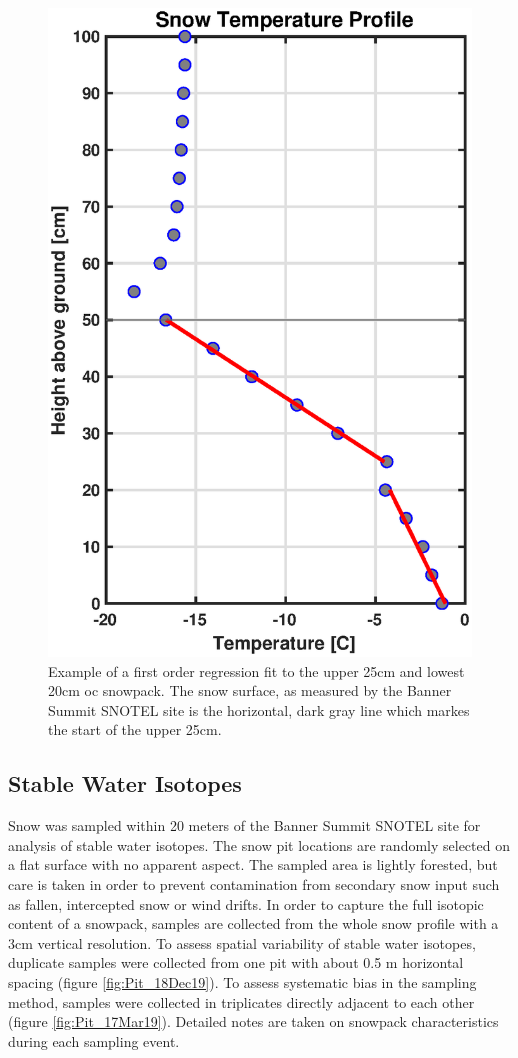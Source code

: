 \begin{figure}[H]
    \centering
    \includegraphics[width=0.5\linewidth]{figures/TempGrad/TempGrad_Ex.eps}
    \caption{Example of a first order regression fit to the upper 25cm and lowest 20cm oc snowpack. The snow surface, as measured by the Banner Summit SNOTEL site is the horizontal, dark gray line which markes the start of the upper 25cm.}
    \label{fig:TempGrad_Ex}
\end{figure}

\subsection{Stable Water Isotopes}
Snow was sampled within 20 meters of the Banner Summit SNOTEL site for analysis of stable water isotopes. The snow pit locations are randomly selected on a flat surface with no apparent aspect. The sampled area is lightly forested, but care is taken in order to prevent contamination from secondary snow input such as fallen, intercepted snow or wind drifts. In order to capture the full isotopic content of a snowpack, samples are collected from the whole snow profile with a 3cm vertical resolution. To assess spatial variability of stable water isotopes, duplicate samples were collected from one pit with about 0.5 m horizontal spacing (figure \ref{fig:Pit_18Dec19}). To assess systematic bias in the sampling method, samples were collected in triplicates directly adjacent to each other (figure \ref{fig:Pit_17Mar19}). Detailed notes are taken on snowpack characteristics during each sampling event.

